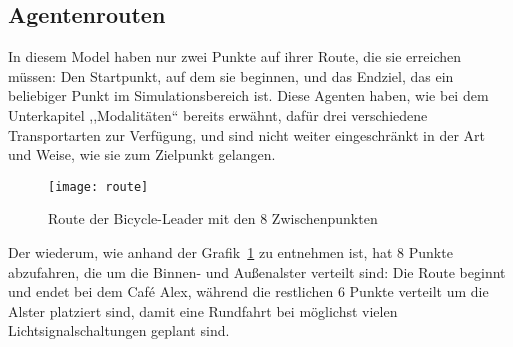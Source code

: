 %

\subsection{Agentenrouten}\label{subsec:routs}

In diesem Model haben  nur zwei Punkte auf ihrer Route, die sie erreichen müssen: Den Startpunkt, auf dem sie beginnen, und das Endziel, das ein beliebiger Punkt im Simulationsbereich ist.
Diese Agenten haben, wie bei dem Unterkapitel ,,Modalitäten`` bereits erwähnt, dafür drei verschiedene Transportarten zur Verfügung, und sind nicht weiter eingeschränkt in der Art und Weise, wie sie zum Zielpunkt gelangen.

\begin{figure}[h]
    \centering
    \texttt{[image: route]}
    \caption{Route der Bicycle-Leader mit den 8 Zwischenpunkten}
    \label{fig:bicycleleader-route}
\end{figure}

Der  wiederum, wie anhand der Grafik~\ref{fig:bicycleleader-route} zu entnehmen ist, hat 8 Punkte abzufahren, die um die Binnen- und Außenalster verteilt sind:
Die Route beginnt und endet bei dem Café Alex, während die restlichen 6 Punkte verteilt um die Alster platziert sind, damit eine Rundfahrt bei möglichst vielen Lichtsignalschaltungen geplant sind.

